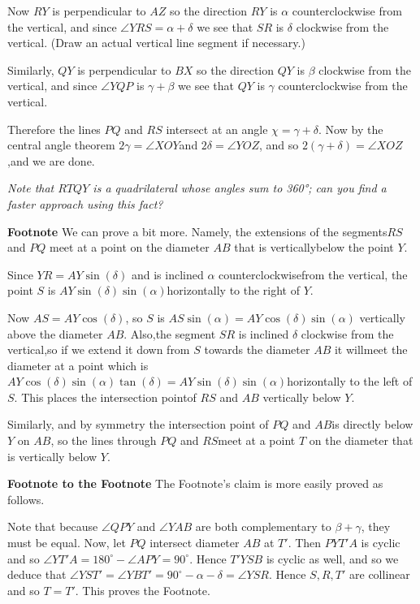 \begin{enumerate}
 Now $RY$ is perpendicular to $AZ$ so the direction $RY$ is $\alpha$ counterclockwise from the vertical, and since $\angle YRS = \alpha + \delta$ we see that $SR$ is $\delta$ clockwise from the vertical. (Draw an actual vertical line segment if necessary.)

 Similarly, $QY$ is perpendicular to $BX$ so the direction $QY$ is $\beta$ clockwise from the vertical, and since $\angle YQP$ is $\gamma + \beta$ we see that $QY$ is $\gamma$ counterclockwise from the vertical.

 Therefore the lines $PQ$ and $RS$ intersect at an angle $\chi = \gamma + \delta$. Now by the central angle theorem $2\gamma = \angle XOY$and $2\delta = \angle YOZ$, and so $2(\gamma + \delta) = \angle XOZ$,and we are done.

 \textit{Note that $RTQY$ is a quadrilateral whose angles sum to 360°; can you find a faster approach using this fact?}

 \textbf{Footnote} We can prove a bit more. Namely, the extensions of the segments$RS$ and $PQ$ meet at a point on the diameter $AB$ that is verticallybelow the point $Y$.

 Since $YR = AY \sin(\delta)$ and is inclined $\alpha$ counterclockwisefrom the vertical, the point $S$ is $AY \sin(\delta) \sin(\alpha)$horizontally to the right of $Y$.

 Now $AS = AY \cos(\delta)$, so $S$ is $AS \sin(\alpha) = AY \cos(\delta)\sin(\alpha)$ vertically above the diameter $AB$. Also,the segment $SR$ is inclined $\delta$ clockwise from the vertical,so if we extend it down from $S$ towards the diameter $AB$ it willmeet the diameter at a point which is$AY \cos(\delta)\sin(\alpha)\tan(\delta) = AY \sin(\delta)\sin(\alpha)$horizontally to the left of $S$. This places the intersection pointof $RS$ and $AB$ vertically below $Y$.

 Similarly, and by symmetry the intersection point of $PQ$ and $AB$is directly below $Y$ on $AB$, so the lines through $PQ$ and $RS$meet at a point $T$ on the diameter that is vertically below $Y$.

 \textbf{Footnote to the Footnote} The Footnote's claim is more easily proved as follows.

 Note that because $\angle{QPY}$ and $\angle{YAB}$ are both complementary to $\beta + \gamma$, they must be equal. Now, let $PQ$ intersect diameter $AB$ at $T'$. Then $PYT'A$ is cyclic and so $\angle{YT'A} = 180^\circ - \angle{APY} = 90^\circ$. Hence $T'YSB$ is cyclic as well, and so we deduce that $\angle{YST'} = \angle{YBT'} = 90^\circ - \alpha - \delta = \angle{YSR}.$ Hence $S, R, T'$ are collinear and so $T = T'$. This proves the Footnote.


\end{enumerate}

